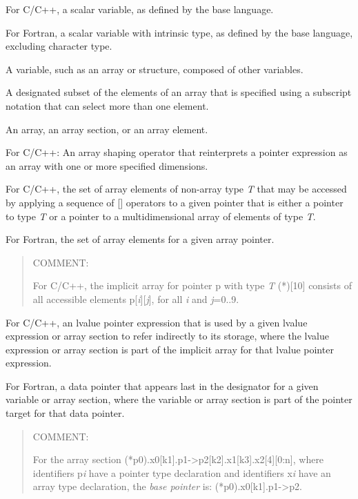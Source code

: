 \glossarydefstart
For C/C++, a scalar variable, as defined by the base language.

For Fortran, a scalar variable with intrinsic type, as defined by 
the base language, excluding character type.
\glossarydefend

\glossarydefstart
A variable, such as an array or structure, composed of other variables.
\glossarydefend

\glossarydefstart
A designated subset of the elements of an array that is specified using a
subscript notation that can select more than one element.
\glossarydefend

\glossarydefstart
An array, an array section, or an array element.
\glossarydefend

\glossarydefstart
For C/C++: An array shaping operator that reinterprets a pointer expression as
an array with one or more specified dimensions.
\glossarydefend

\glossarydefstart
For C/C++, the set of array elements of non-array type \emph{T} that may be
accessed by applying a sequence of [] operators to a given pointer that is
either a pointer to type \emph{T} or a pointer to a multidimensional array of
elements of type \emph{T}.

For Fortran, the set of array elements for a given array pointer.
\begin{quote}
COMMENT:

For C/C++, the implicit array for pointer p with type \emph{T} (*)[10] 
consists of all accessible elements p[\emph{i}][\emph{j}], for all 
\emph{i} and \emph{j}=0..9.
\end{quote}
\glossarydefend

\glossarydefstart
For C/C++, an lvalue pointer expression that is used by a given lvalue
expression or array section to refer indirectly to its storage, where
the lvalue expression or array section is part of the implicit array for that
lvalue pointer expression.

For Fortran, a data pointer that appears last in the designator for a given
variable or array section, where the variable or array section is part
of the pointer target for that data pointer.

\begin{quote}
COMMENT: 

For the array section
(*p0).x0[k1].p1->p2[k2].x1[k3].x2[4][0:n],
where identifiers p\emph{i} have a pointer type declaration
and identifiers x\emph{i} have an array type declaration, the 
\emph{base pointer} is: (*p0).x0[k1].p1->p2.
\end{quote}
\glossarydefend

